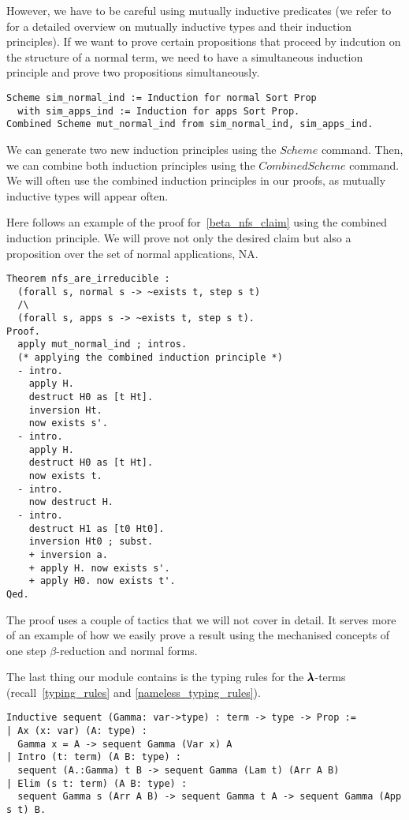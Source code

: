 However, we have to be careful using mutually inductive predicates (we refer to~\cite[Chapter~14.1]{CoqArt} for a detailed overview on mutually inductive types and their induction principles).
If we want to prove certain propositions that proceed by indcution on the structure of a normal term, we need to have a simultaneous induction principle and prove two propositions simultaneously.
\begin{lstlisting}[language=Coq]
Scheme sim_normal_ind := Induction for normal Sort Prop
  with sim_apps_ind := Induction for apps Sort Prop.
Combined Scheme mut_normal_ind from sim_normal_ind, sim_apps_ind.
\end{lstlisting}

We can generate two new induction principles using the \lst$Scheme$ command.
Then, we can combine both induction principles using the \lst$Combined Scheme$ command.
We will often use the combined induction principles in our proofs, as mutually inductive types will appear often. 

Here follows an example of the proof for~\cref{beta_nfs_claim} using the combined induction principle.
We will prove not only the desired claim but also a proposition over the set of normal applications, NA.

\begin{lstlisting}[language=Coq]
Theorem nfs_are_irreducible :
  (forall s, normal s -> ~exists t, step s t)
  /\
  (forall s, apps s -> ~exists t, step s t).
Proof.
  apply mut_normal_ind ; intros.
  (* applying the combined induction principle *)
  - intro.
    apply H.
    destruct H0 as [t Ht].
    inversion Ht.
    now exists s'.
  - intro.
    apply H.
    destruct H0 as [t Ht].
    now exists t.
  - intro.
    now destruct H.
  - intro.
    destruct H1 as [t0 Ht0].
    inversion Ht0 ; subst.
    + inversion a.
    + apply H. now exists s'.
    + apply H0. now exists t'.
Qed.
\end{lstlisting}

The proof uses a couple of tactics that we will not cover in detail.
It serves more of an example of how we easily prove a result using the mechanised concepts of one step $\beta$-reduction and normal forms.

The last thing our module contains is the typing rules for the $\pmb{\lambda}$-terms (recall~\cref{typing_rules} and \cref{nameless_typing_rules}).

\begin{lstlisting}[language=Coq]
Inductive sequent (Gamma: var->type) : term -> type -> Prop := 
| Ax (x: var) (A: type) :
  Gamma x = A -> sequent Gamma (Var x) A
| Intro (t: term) (A B: type) :
  sequent (A.:Gamma) t B -> sequent Gamma (Lam t) (Arr A B)
| Elim (s t: term) (A B: type) :
  sequent Gamma s (Arr A B) -> sequent Gamma t A -> sequent Gamma (App s t) B.
\end{lstlisting}

